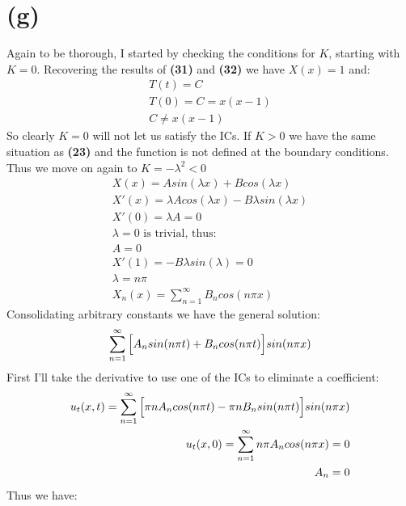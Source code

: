 \documentclass{article}
\begin{document}
\section*{\textbf{(g)}}
Again to be thorough, I started by checking the conditions for $K$, starting with $K=0$. Recovering the results of \textbf{(31)} and \textbf{(32)} we have $X(x) = 1$ and:
\begin{equation}
\begin{aligned}
T(t) = C\\
T(0) = C = x(x-1)\\
C \neq x(x-1)
\end{aligned}
\end{equation}
So clearly $K=0$ will not let us satisfy the ICs. If $K>0$ we have the same situation as \textbf{(23)} and the function is not defined at the boundary conditions. Thus we move on again to $K = -\lambda^2<0$
\begin{equation}
\begin{aligned}
X(x) = Asin(\lambda x) + Bcos(\lambda x)\\
X'(x) = \lambda Acos(\lambda x) - B\lambda sin(\lambda x)\\
X'(0) = \lambda A = 0\\
\text{$\lambda =0$ is trivial, thus:}\\
A = 0\\
X'(1) = -B\lambda sin(\lambda) = 0\\
\lambda = n\pi\\
X_n(x) = \sum_{n=1}^{\infty}B_ncos(n\pi x)
\end{aligned}
\end{equation}
Consolidating arbitrary constants we have the general solution:
\begin{equation}
\begin{aligned}
\sum^{\infty}_{n=1}\Big{[}A_nsin(n\pi t) + B_ncos(n\pi t)\Big{]}sin(n\pi x)	
\end{aligned}
\end{equation}
First I'll take the derivative to use one of the ICs to eliminate a coefficient:
\begin{equation}
\begin{aligned}
u_t(x,t) = \sum^{\infty}_{n=1}\Big{[}\pi n A_ncos(n\pi t) - \pi n B_nsin(n\pi t)\Big{]}sin(n\pi x)\\
u_t(x,0) = \sum_{n=1}^{\infty}n\pi A_ncos(n\pi x) =0\\
A_n=0
\end{aligned}
\end{equation}
Thus we have:
\end{document}
